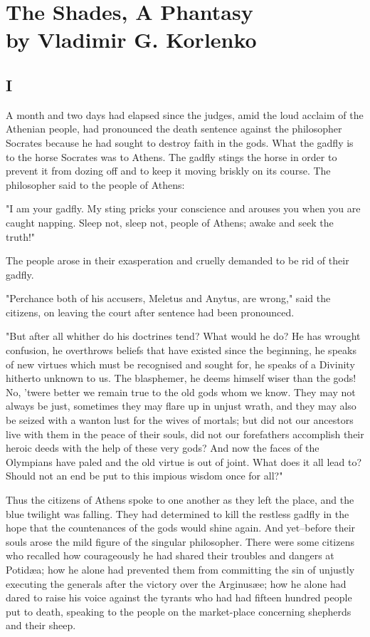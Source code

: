 \chapter{The Shades, A Phantasy\\
\small \hspace{20pt}
by Vladimir G. Korlenko}

\section{I}

\lettrine[lines=3,lhang=0.11,lraise=0,loversize=0.05]{A}{}%
month and two days had elapsed since the judges, amid the loud
acclaim of the Athenian people, had pronounced the death sentence
against the philosopher Socrates because he had sought to destroy
faith in the gods. What the gadfly is to the horse Socrates was to
Athens. The gadfly stings the horse in order to prevent it from dozing
off and to keep it moving briskly on its course. The philosopher said
to the people of Athens:

"I am your gadfly. My sting pricks your conscience and arouses you
when you are caught napping. Sleep not, sleep not, people of Athens;
awake and seek the truth!"

The people arose in their exasperation and cruelly demanded to be rid
of their gadfly.

"Perchance both of his accusers, Meletus and Anytus, are wrong," said
the citizens, on leaving the court after sentence had been pronounced.

"But after all whither do his doctrines tend? What would he do? He has
wrought confusion, he overthrows beliefs that have existed since the
beginning, he speaks of new virtues which must be recognised and
sought for, he speaks of a Divinity hitherto unknown to us. The
blasphemer, he deems himself wiser than the gods! No, 'twere better we
remain true to the old gods whom we know. They may not always be just,
sometimes they may flare up in unjust wrath, and they may also be
seized with a wanton lust for the wives of mortals; but did not our
ancestors live with them in the peace of their souls, did not our
forefathers accomplish their heroic deeds with the help of these very
gods? And now the faces of the Olympians have paled and the old virtue
is out of joint. What does it all lead to? Should not an end be put to
this impious wisdom once for all?"

Thus the citizens of Athens spoke to one another as they left the
place, and the blue twilight was falling. They had determined to kill
the restless gadfly in the hope that the countenances of the gods
would shine again. And yet--before their souls arose the mild figure
of the singular philosopher. There were some citizens who recalled how
courageously he had shared their troubles and dangers at Potidæa; how
he alone had prevented them from committing the sin of unjustly
executing the generals after the victory over the Arginusæe; how he
alone had dared to raise his voice against the tyrants who had had
fifteen hundred people put to death, speaking to the people on the
market-place concerning shepherds and their sheep.


